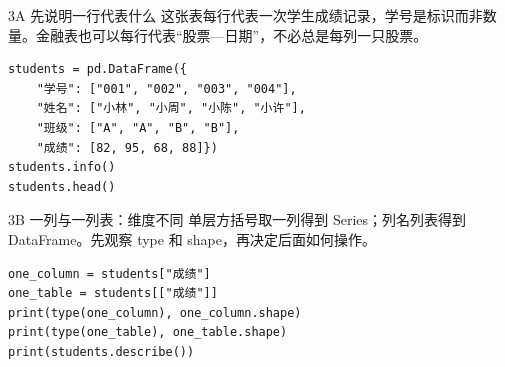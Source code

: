\begin{frame}[fragile]{3A 先说明一行代表什么}
\small 这张表每行代表一次学生成绩记录，学号是标识而非数量。金融表也可以每行代表“股票—日期”，不必总是每列一只股票。
\medskip
\begin{lstlisting}
students = pd.DataFrame({
    "学号": ["001", "002", "003", "004"],
    "姓名": ["小林", "小周", "小陈", "小许"],
    "班级": ["A", "A", "B", "B"],
    "成绩": [82, 95, 68, 88]})
students.info()
students.head()
\end{lstlisting}
\end{frame}

\begin{frame}[fragile]{3B 一列与一列表：维度不同}
\small 单层方括号取一列得到 Series；列名列表得到 DataFrame。先观察 type 和 shape，再决定后面如何操作。
\medskip
\begin{lstlisting}
one_column = students["成绩"]
one_table = students[["成绩"]]
print(type(one_column), one_column.shape)
print(type(one_table), one_table.shape)
print(students.describe())
\end{lstlisting}
\end{frame}
